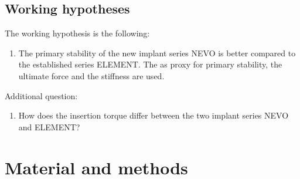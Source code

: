 \documentclass[12pt, a4paper, twoside]{report}
\begin{document}
\section{Working hypotheses}
%
The working hypothesis is the following:
\begin{enumerate}
\item The primary stability of the new implant series NEVO is better compared to the established series ELEMENT.
The as proxy for primary stability, the ultimate force and the stiffness are used.
\end{enumerate}
% 
Additional question:
\begin{enumerate}
\item How does the insertion torque differ between the two implant series NEVO and ELEMENT?
\end{enumerate}
%
%
%
%
%
%
%
%
\chapter{Material and methods}
%
%
%
\end{document}
